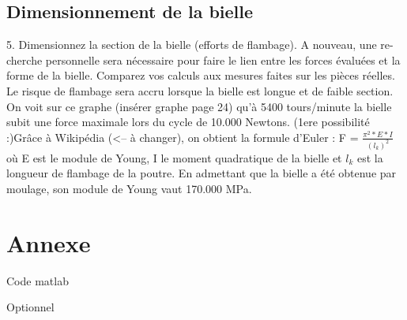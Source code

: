 \documentclass[a4paper,oneside,12pt]{report}
\begin{document}
\section{Dimensionnement de la bielle}
5. Dimensionnez la section de la bielle (efforts de flambage). A nouveau, une re-
cherche personnelle sera nécessaire pour faire le lien entre les forces évaluées
et la forme de la bielle. Comparez vos calculs aux mesures faites sur les pièces
réelles.
Le risque de flambage sera accru lorsque la bielle est longue et de faible section.
On voit sur ce graphe (insérer graphe page 24) qu'à 5400 tours/minute la bielle subit une force maximale lors du cycle de 10.000 Newtons.
(1ere possibilité :)Grâce à Wikipédia (<-- à changer), on obtient la formule d'Euler : F = $\frac{\pi^2 *E*I}{(l_k)^2}$ \\
où E est le module de Young, I le moment quadratique de la bielle et $l_k$ est la longueur de flambage de la poutre. En admettant que la bielle a été obtenue par moulage, son module de Young vaut 170.000 MPa.


\chapter{Annexe}
Code matlab

Optionnel
\end{document}
